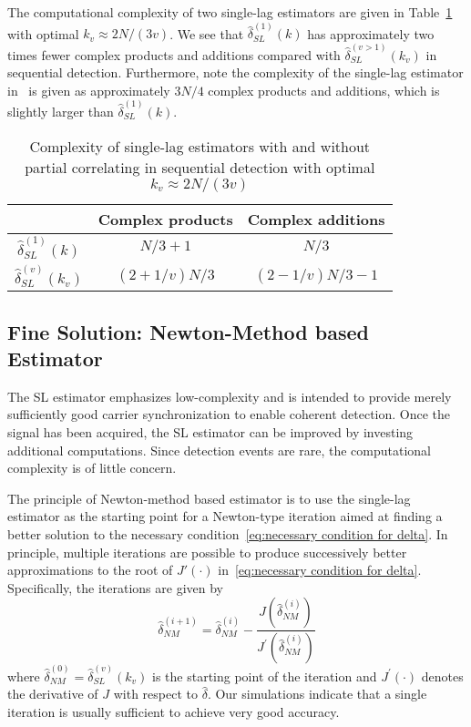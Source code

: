 The  computational complexity of two single-lag estimators are given
in Table~\ref{table:computational complexity comparison} with optimal $k_v \approx 2N/(3v)$. 
We see that $\hat{\delta}_{SL}^{(1)}(k)$ has approximately two times
fewer complex products and additions compared with
$\hat{\delta}_{SL}^{(v>1)}(k_v)$ in sequential detection. 
Furthermore, note the complexity of the single-lag estimator
in~\cite{Morelli_Mengali_98} is given as approximately $3N/4$ complex products and additions, 
which is slightly larger than $\hat{\delta}_{SL}^{(1)}(k)$.

\begin{table}[t]
  \caption{Complexity of single-lag estimators with and without partial correlating in sequential detection with optimal $k_v\approx2N/(3v)$}  %
  \centering 
  \begin{tabular}{c c c} 
  \hline\hline 
   & Complex products & Complex additions \\ [0.5ex] 
  \hline 
  $\hat{\delta}_{SL}^{(1)}(k)$  & $N/3+1$ & $N/3$ \\ 
  $\hat{\delta}_{SL}^{(v)}(k_v)$ & $(2+1/v) N/3$ & $(2-1/v)N/3-1$ \\ [1ex]
  \hline
  \end{tabular}
  \label{table:computational complexity comparison}
\end{table}

\subsection{Fine Solution: Newton-Method based Estimator}

The SL estimator emphasizes low-complexity  and is intended
to provide merely sufficiently good carrier synchronization to enable coherent detection.
Once the signal has been acquired, the SL estimator can be improved by 
investing additional computations. Since detection events are rare, the computational
complexity is of little concern.

The principle of Newton-method based estimator is to use the
single-lag estimator as the starting point for a Newton-type iteration  
aimed at finding a better solution to the necessary condition~\eqref{eq:necessary condition for delta}. 
In principle, multiple iterations are possible to produce successively better approximations to the root of
$J'(\cdot)$ in~\eqref{eq:necessary condition for delta}.
Specifically, the iterations are given by
\begin{equation}
  \label{eq:iter_NM_est}
  \hat{\delta}_{NM}^{(i+1)}=\hat{\delta}_{NM}^{(i)}-
  \frac{J(\hat{\delta}_{NM}^{(i)})}{J^\prime(\hat{\delta}_{NM}^{(i)})}
\end{equation}
where $\hat{\delta}_{NM}^{(0)}=\hat{\delta}^{(v)}_{SL}(k_v)$ is the
starting point of the iteration and
$J^\prime(\cdot)$ denotes the derivative of $J$ with respect to $\hat{\delta}$. 
Our simulations indicate that  a single iteration is usually sufficient to achieve very good accuracy.

